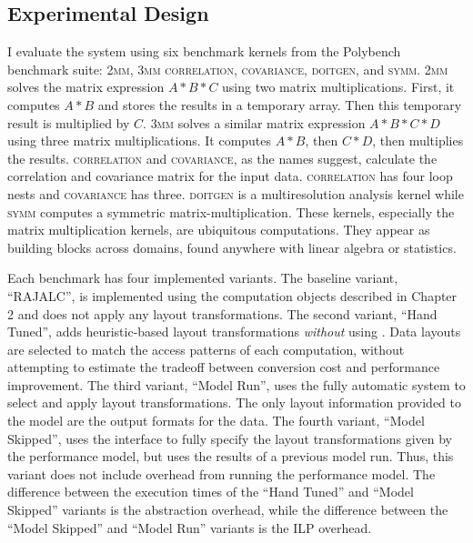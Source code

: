 \subsection{Experimental Design}

I evaluate the \FormatDecisions{} system using six benchmark kernels from the Polybench~\cite{pouchet2012polybench} benchmark suite: \textsc{2mm}, \textsc{3mm} \textsc{correlation}, \textsc{covariance}, \textsc{doitgen}, and \textsc{symm}.
\textsc{2mm} solves the matrix expression $A*B*C$ using two matrix multiplications. 
First, it computes $A*B$ and stores the results in a temporary array.
Then this temporary result is multiplied by $C$.
\textsc{3mm} solves a similar matrix expression $A*B*C*D$ using three matrix multiplications.
It computes $A*B$, then $C*D$, then multiplies the results.
\textsc{correlation} and \textsc{covariance}, as the names suggest, calculate the correlation and covariance matrix for the input data. 
\textsc{correlation} has four loop nests and \textsc{covariance} has three.
\textsc{doitgen} is a multiresolution analysis kernel while \textsc{symm} computes a symmetric matrix-multiplication.
These kernels, especially the matrix multiplication kernels, are ubiquitous computations.
They appear as building blocks across domains, found anywhere with linear algebra or statistics.

Each benchmark has four implemented variants. 
The baseline variant, ``RAJALC'', is implemented using the computation objects described in Chapter 2 and does not apply any layout transformations.
The second variant, ``Hand Tuned'', adds heuristic-based layout transformations \textit{without} using \FormatDecisions{}.
Data layouts are selected to match the access patterns of each computation, without attempting to estimate the tradeoff between conversion cost and performance improvement.
The third variant, ``Model Run'', uses the fully automatic \FormatDecisions{} system to select and apply layout transformations.
The only layout information provided to the model are the output formats for the data.
The fourth variant, ``Model Skipped'', uses the \FormatDecisions{} interface to fully specify the layout transformations given by the performance model, but uses the results of a previous model run.
Thus, this variant does not include overhead from running the performance model.
The difference between the execution times of the ``Hand Tuned'' and ``Model Skipped'' variants is the abstraction overhead, while the difference between the ``Model Skipped'' and ``Model Run'' variants is the ILP overhead.


